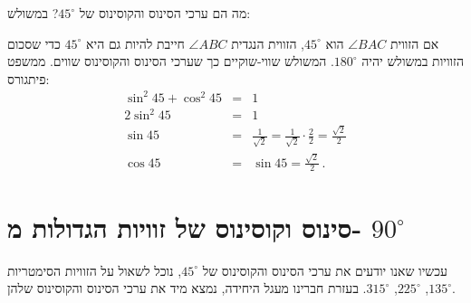 \documentclass[12pt,a4paper]{article}
\begin{document}
מה הם ערכי הסינוס והקוסינוס של 
$45^\circ$?
במשולש:
\begin{center}
\end{center}
אם הזווית
$\angle BAC$
הוא
$45^\circ$,
הזווית הנגדית
$\angle ABC$
חייבת להיות גם היא
$45^\circ$
כדי שסכום הזוויות במשולש יהיה
$180^\circ$.
המשולש שווי-שוקיים כך שערכי הסינוס והקוסינוס שווים. ממשפט פיתגורס:
\begin{eqnarray*}
\sin^2 45 + \cos^2 45 &=& 1\\
2\sin^2 45 &=& 1\\
\sin 45 &=& \frac{1}{\sqrt{2}} = \frac{1}{\sqrt{2}}\cdot \frac{2}{2} =\frac{\sqrt{2}}{2}\\
\cos 45 &=& \sin 45 = \frac{\sqrt{2}}{2}\,.
\end{eqnarray*}


\section{סינוס וקוסינוס של זוויות הגדולות מ-%
$90^\circ$}

עכשיו שאנו יודעים את ערכי הסינוס והקוסינוס של
$45^\circ$,
נוכל לשאול על הזוויות הסימטריות
$135^\circ$, $225^\circ$, $315^\circ$.
בעזרת חברינו מעגל היחידה, נמצא מיד את ערכי הסינוס והקוסינוס שלהן.
\end{document}
